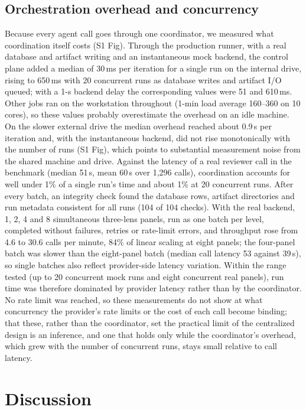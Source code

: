\documentclass[10pt,letterpaper]{article}
\begin{document}
\subsection*{Orchestration overhead and concurrency}

Because every agent call goes through one coordinator, we measured what coordination itself costs (S1 Fig). Through the production runner, with a real database and artifact writing and an instantaneous mock backend, the control plane added a median of 30\,ms per iteration for a single run on the internal drive, rising to 650\,ms with 20 concurrent runs as database writes and artifact I/O queued; with a 1-s backend delay the corresponding values were 51 and 610\,ms. Other jobs ran on the workstation throughout (1-min load average 160--360 on 10 cores), so these values probably overestimate the overhead on an idle machine. On the slower external drive the median overhead reached about 0.9\,s per iteration and, with the instantaneous backend, did not rise monotonically with the number of runs (S1 Fig), which points to substantial measurement noise from the shared machine and drive. Against the latency of a real reviewer call in the benchmark (median 51\,s, mean 60\,s over 1,296 calls), coordination accounts for well under 1\% of a single run's time and about 1\% at 20 concurrent runs. After every batch, an integrity check found the database rows, artifact directories and run metadata consistent for all runs (104 of 104 checks). With the real backend, 1, 2, 4 and 8 simultaneous three-lens panels, run as one batch per level, completed without failures, retries or rate-limit errors, and throughput rose from 4.6 to 30.6 calls per minute, 84\% of linear scaling at eight panels; the four-panel batch was slower than the eight-panel batch (median call latency 53 against 39\,s), so single batches also reflect provider-side latency variation. Within the range tested (up to 20 concurrent mock runs and eight concurrent real panels), run time was therefore dominated by provider latency rather than by the coordinator. No rate limit was reached, so these measurements do not show at what concurrency the provider's rate limits or the cost of each call become binding; that these, rather than the coordinator, set the practical limit of the centralized design is an inference, and one that holds only while the coordinator's overhead, which grew with the number of concurrent runs, stays small relative to call latency.


\section*{Discussion}
\end{document}
